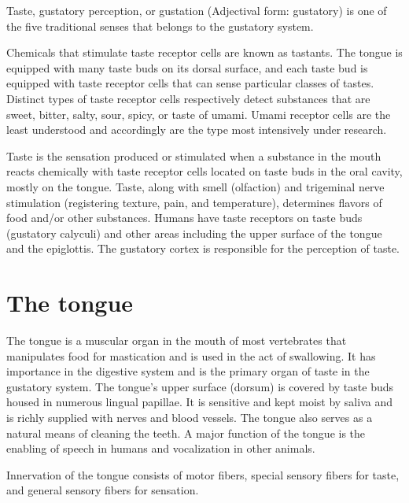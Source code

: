 Taste, gustatory perception, or gustation (Adjectival form: gustatory) is one of the five traditional senses that belongs to the gustatory system.

Chemicals that stimulate taste receptor cells are known as tastants. The tongue is equipped with many taste buds on its dorsal surface, and each taste bud is equipped with taste receptor cells that can sense particular classes of tastes. Distinct types of taste receptor cells respectively detect substances that are sweet, bitter, salty, sour, spicy, or taste of umami. Umami receptor cells are the least understood and accordingly are the type most intensively under research.

Taste is the sensation produced or stimulated when a substance in the mouth reacts chemically with taste receptor cells located on taste buds in the oral cavity, mostly on the tongue. Taste, along with smell (olfaction) and trigeminal nerve stimulation (registering texture, pain, and temperature), determines flavors of food and/or other substances. Humans have taste receptors on taste buds (gustatory calyculi) and other areas including the upper surface of the tongue and the epiglottis. The gustatory cortex is responsible for the perception of taste.

\hypertarget{the-tongue}{%
\section{The tongue}\label{the-tongue}}

The tongue is a muscular organ in the mouth of most vertebrates that manipulates food for mastication and is used in the act of swallowing. It has importance in the digestive system and is the primary organ of taste in the gustatory system. The tongue's upper surface (dorsum) is covered by taste buds housed in numerous lingual papillae. It is sensitive and kept moist by saliva and is richly supplied with nerves and blood vessels. The tongue also serves as a natural means of cleaning the teeth. A major function of the tongue is the enabling of speech in humans and vocalization in other animals.

Innervation of the tongue consists of motor fibers, special sensory fibers for taste, and general sensory fibers for sensation.

